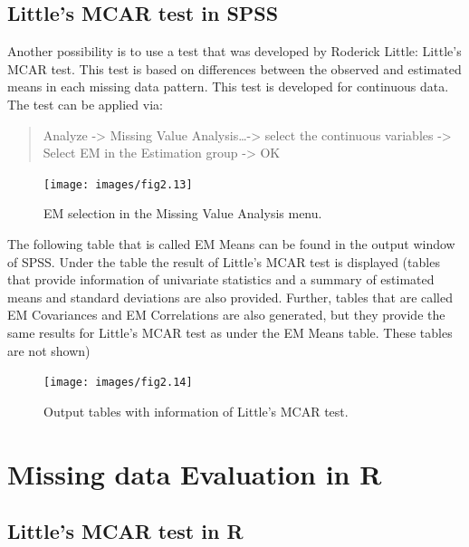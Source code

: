 \documentclass[
]{book}
\begin{document}
\hypertarget{littles-mcar-test-in-spss}{%
\subsection{Little's MCAR test in SPSS}\label{littles-mcar-test-in-spss}}

Another possibility is to use a test that was developed by Roderick Little: Little's MCAR test. This test is based on differences between the observed and estimated means in each missing data pattern. This test is developed for continuous data. The test can be applied via:

\begin{quote}
Analyze -\textgreater{} Missing Value Analysis\ldots-\textgreater{} select the continuous variables -\textgreater{} Select EM in the Estimation group -\textgreater{} OK
\end{quote}

\begin{figure}

{\centering \texttt{[image: images/fig2.13]} 

}

\caption{EM selection in the Missing Value Analysis menu.}\label{fig:fig2-12}
\end{figure}

The following table that is called EM Means can be found in the output window of SPSS. Under the table the result of Little's MCAR test is displayed (tables that provide information of univariate statistics and a summary of estimated means and standard deviations are also provided. Further, tables that are called EM Covariances and EM Correlations are also generated, but they provide the same results for Little's MCAR test as under the EM Means table. These tables are not shown)

\begin{figure}

{\centering \texttt{[image: images/fig2.14]} 

}

\caption{Output tables with information of Little’s MCAR test.}\label{fig:tab2-7}
\end{figure}

\hypertarget{missing-data-evaluation-in-r}{%
\section{Missing data Evaluation in R}\label{missing-data-evaluation-in-r}}

\hypertarget{littles-mcar-test-in-r}{%
\subsection{Little's MCAR test in R}\label{littles-mcar-test-in-r}}
\end{document}
